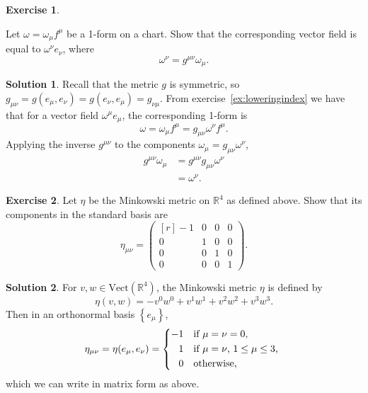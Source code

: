 \documentclass[11pt, a4paper]{article}
\theoremstyle{definition}
\newtheorem{ex}{Exercise}[part]
\newtheorem{sol}{Solution}[part]
\begin{document}
\begin{ex}\label{ex:raisingindex}

Let $\omega = \omega_\mu f^\mu$ be a 1-form on a chart. Show that the corresponding vector field is equal to $\omega^\nu e_\nu$, where
\[
    \omega^\nu = g^{\mu\nu} \omega_\mu.
\]

\end{ex}

\begin{sol}

Recall that the metric $g$ is symmetric, so $g_{\mu\nu} = g(e_\mu, e_\nu) = g(e_\nu, e_\mu) = g_{\nu\mu}$.
From exercise~\ref{ex:loweringindex} we have that for a vector field $\omega^\mu e_\mu$, the corresponding 1-form is
\[
    \omega = \omega_\mu f^\mu = g_{\mu\nu}\omega^\nu f^\mu.
\]
Applying the inverse $g^{\mu\nu}$ to the components $\omega_\mu = g_{\mu\nu}\omega^\nu$,
\begin{align*}
    g^{\mu\nu} \omega_\mu &= g^{\mu\nu} g_{\mu\nu} \omega^\nu \\
                          &= \omega^\nu.
\end{align*}

\end{sol}

\begin{ex}

Let $\eta$ be the Minkowski metric on $\mathbb{R}^4$ as defined above.
Show that its components in the standard basis are
\[
    \eta_{\mu\nu} = \begin{pmatrix*}[r]
            -1 & 0 & 0 & 0 \\
            0 & 1 & 0 & 0 \\
            0 & 0 & 1 & 0 \\
            0 & 0 & 0 & 1
        \end{pmatrix*}.
\]

\end{ex}

\begin{sol}

For $v, w \in \text{Vect}(\mathbb{R}^4)$, the Minkowski metric $\eta$ is defined by
\[
    \eta(v, w) = -v^0 w^0 + v^1 w^1 + v^2 w^2 + v^3 w^3.
\]
Then in an orthonormal basis $\left\{e_\mu\right\}$,
\[
    \eta_{\mu\nu} = \eta(e_\mu, e_\nu) = \begin{dcases*}
            -1            & if $\mu = \nu = 0$, \\ %
            \phantom{-} 1 & if $\mu = \nu$, $1 \leq \mu \leq 3$, \\ %
            \phantom{-} 0 & otherwise,
        \end{dcases*}
\]
which we can write in matrix form as above.

\end{sol}
\end{document}
